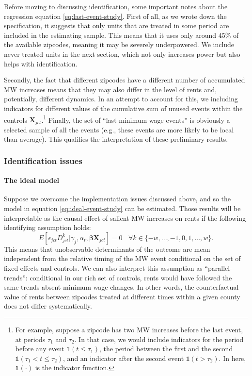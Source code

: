     Before moving to discussing identification, some important notes about the regression equation \eqref{eq:last-event-study}. First of all, as we wrote down the specification, it suggests that only units that are treated in some period are included in the estimating sample. This means that it uses only around 45\% of the available zipcodes, meaning it may be severely underpowered. We include never treated units in the next section, which not only increases power but also helps with identification. 
    
    Secondly, the fact that different zipcodes have a different number of accumulated MW increases means that they may also differ in the level of rents and, potentially, different dynamics. In an attempt to account for this, we including indicators for different values of the cumulative sum of unused events within the controls $\boldsymbol{X}_{jct}$.\footnote{For example, suppose a zipcode has two MW increases before the last event, at periods $\tau_1$ and $\tau_2$. In that case, we would include indicators for the period before any event $\mathds{1}\left(t \leq \tau_1\right)$, the period between the first and the second $\mathds{1}\left(\tau_1 <  t \leq \tau_2 \right)$, and an indicator after the second event $\mathds{1}\left(t > \tau_2\right)$. In here, $\mathds{1} (\cdot)$ is the indicator function.} Finally, the set of ``last minimum wage events'' is obviously a selected sample of all the events (e.g., these events are more likely to be local than average). This qualifies the interpretation of these preliminary results.

\subsubsection{Identification issues}
    
    \paragraph{The ideal model}
    
    Suppose we overcome the implementation issues discussed above, and so the model in equation \eqref{eq:ideal-event-study} can be estimated. Those results will be interpretable as the causal effect of salient MW increases on rents if the following identifying assumption holds: $$E \left[ \epsilon_{jct} D_{jct}^k \big| \gamma_j, \alpha_{t}, \boldsymbol{\beta} \boldsymbol{X}_{jct}\right]  = 0 \ \ \ \ \forall k\in\{-w, ..., -1, 0, 1, ..., w\}. $$ This means that unobservable determinants of the outcome are mean independent from the relative timing of the MW event conditional on the set of fixed effects and controls. We can also interpret this assumption as ``parallel-trends'': conditional in our rich set of controls, rents would have followed the same trends absent minimum wage changes. In other words, the counterfactual value of rents between zipcodes treated at different times within a given county does not differ systematically.
    
